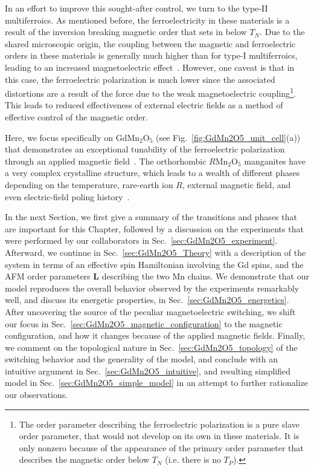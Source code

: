 In an effort to improve this sought-after control, we turn to the type-II multiferroics.
As mentioned before, the ferroelectricity in these materials is a result of the inversion breaking magnetic order that sets in below $T_N$.
Due to the shared microscopic origin, the coupling between the magnetic and ferroelectric orders in these materials is generally much higher than for type-I multiferroics, leading to an increased magnetoelectric effect~\cite{Oh2014,Radaelli08Y}.
However, one caveat is that in this case, the ferroelectric polarization is much lower since the associated distortions are a result of the force due to the weak magnetoelectric coupling\footnote{The order parameter describing the ferroelectric polarization is a pure slave order parameter, that would not develop on its own in these materials. It is only nonzero because of the appearance of the primary order parameter that describes the magnetic order below $T_N$ (i.e. there is no $T_{P}$).}.
This leads to reduced effectiveness of external electric fields as a method of effective control of the magnetic order.  

Here, we focus specifically on GdMn$_2$O$_5$ (see Fig.~\ref{fig:GdMn2O5_unit_cell}(a)) that demonstrates an exceptional tunability of the ferroelectric polarization through an applied magnetic field~\cite{Khomskii2009,Lee13}.
The orthorhombic $R$Mn$_2$O$_5$ manganites have a very complex crystalline structure, which leads to a wealth of different phases depending on the temperature, rare-earth ion $R$, external magnetic field, and even electric-field poling history~\cite{Chapon04, Chapon06, Blake05, Radaelli09,Radaelli08, Zheng2019}.

In the next Section, we first give a summary of the transitions and phases that are important for this Chapter, followed by a discussion on the experiments that were performed by our collaborators in Sec.~\ref{sec:GdMn2O5_experiment}.
Afterward, we continue in Sec.~\ref{sec:GdMn2O5_Theory} with a description of the system in terms of an effective spin Hamiltonian involving the Gd spins, and the AFM order parameters $\bm L$ describing the two Mn chains.
We demonstrate that our model reproduces the overall behavior observed by the experiments remarkably well, and discuss its energetic properties, in Sec.~\ref{sec:GdMn2O5_energetics}.
After uncovering the source of the peculiar magnetoelectric switching, we shift our focus in Sec.~\ref{sec:GdMn2O5_magnetic_configuration} to the magnetic configuration, and how it changes because of the applied magnetic fields.
Finally, we comment on the topological nature in Sec.~\ref{sec:GdMn2O5_topology} of the switching behavior and the generality of the model, and conclude with an intuitive argument in Sec.~\ref{sec:GdMn2O5_intuitive}, and resulting simplified model in Sec.~\ref{sec:GdMn2O5_simple_model} in an attempt to further rationalize our observations. 

